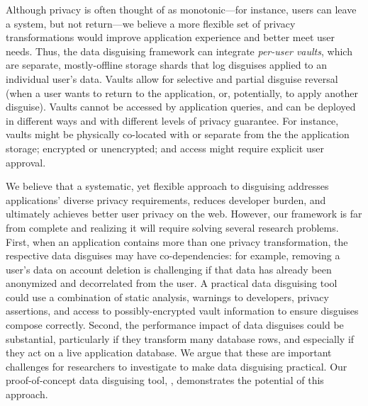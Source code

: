 Although privacy is often thought of as monotonic---for instance, users can
leave a system, but not return---we believe a more flexible set of privacy
transformations would improve application experience and better meet user
needs.
%
Thus, the data disguising framework can integrate \emph{per-user vaults}, which are
separate, mostly-offline storage shards that log disguises applied to an individual user's data.
%
Vaults allow for selective and partial disguise reversal (\eg when a user
wants to return to the application, or, potentially, to apply another disguise).
%
Vaults cannot be accessed by application queries, and can be deployed in different
ways and with different levels of privacy guarantee.
%
For instance, vaults might be physically co-located with or separate from the the
application storage; encrypted or unencrypted; and access might require explicit
user approval.
%

%

%
We believe that a systematic, yet flexible approach to disguising addresses applications'
diverse privacy requirements, reduces developer burden, and ultimately achieves better user privacy on
the web.
%
However, our framework is far from complete and realizing it will require solving several research
problems.
%
First, when an application contains more than one privacy transformation, the respective
data disguises may have co-dependencies: for example, removing a user's data on account
deletion is challenging if that data has already been anonymized and decorrelated from the
user.
%
A practical data disguising tool could use a combination of static analysis,
warnings to developers, privacy assertions, and access to possibly-encrypted
vault information to ensure disguises compose correctly.
%
Second, the performance impact of data disguises could be substantial, particularly if they
transform many database rows, and especially if they act on a live application database.
%
We argue that these are important challenges for researchers to investigate to make data
disguising practical.
%
Our proof-of-concept data disguising tool, \sys, demonstrates the potential of this
approach.
%
%
%
%
%
%

